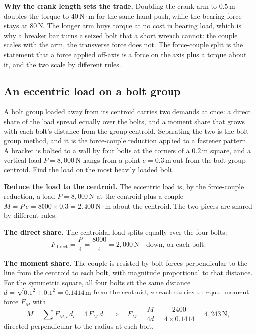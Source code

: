 \textbf{Why the crank length sets the trade.} Doubling the crank arm to
$0.5\,\si{\meter}$ doubles the torque to $40\,\text{N}\cdot\text{m}$ for
the same hand push, while the bearing force stays at $80\,\text{N}$. The
longer arm buys torque at no cost in bearing load, which is why a breaker
bar turns a seized bolt that a short wrench cannot: the couple scales with
the arm, the transverse force does not. The force-couple split is the
statement that a force applied off-axis is a force on the axis plus a
torque about it, and the two scale by different rules.

\subsection{An eccentric load on a bolt group}

A bolt group loaded away from its centroid carries two demands at once: a
direct share of the load spread equally over the bolts, and a moment share
that grows with each bolt's distance from the group centroid. Separating
the two is the bolt-group method, and it is the force-couple reduction
applied to a fastener pattern. A bracket is bolted to a wall by four bolts
at the corners of a $0.2\,\si{\meter}$ square, and a vertical load
$P = 8{,}000\,\text{N}$ hangs from a point $e = 0.3\,\si{\meter}$ out from
the bolt-group centroid. Find the load on the most heavily loaded bolt.

\textbf{Reduce the load to the centroid.} The eccentric load is, by the
force-couple reduction, a load $P = 8{,}000\,\text{N}$ at the centroid plus
a couple $M = P\,e = 8000 \times 0.3 = 2{,}400\,\text{N}\cdot\text{m}$ about
the centroid. The two pieces are shared by different rules.

\textbf{The direct share.} The centroidal load splits equally over the four
bolts:
\[
F_{\text{direct}} = \frac{P}{4} = \frac{8000}{4} = 2{,}000\,\text{N}
\quad\text{down, on each bolt.}
\]

\textbf{The moment share.} The couple is resisted by bolt forces
perpendicular to the line from the centroid to each bolt, with magnitude
proportional to that distance. For the symmetric square, all four bolts sit
the same distance $d = \sqrt{0.1^2 + 0.1^2} = 0.1414\,\si{\meter}$ from the
centroid, so each carries an equal moment force $F_M$ with
\[
M = \sum F_{M,i}\,d_i = 4\,F_M\,d
\quad\Longrightarrow\quad
F_M = \frac{M}{4d} = \frac{2400}{4 \times 0.1414} = 4{,}243\,\text{N},
\]
directed perpendicular to the radius at each bolt.

